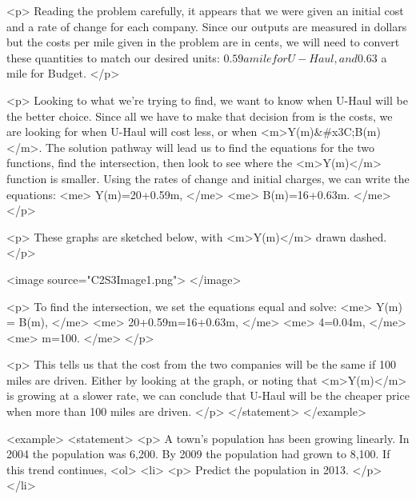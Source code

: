             <p>
                Reading the problem carefully, it appears that we were given an initial cost and a rate of change for each company.
                Since our outputs are measured in dollars but the costs per mile given in the problem are in cents, we will need to convert these quantities to match our desired units: $0.59 a mile for U-Haul, and $0.63 a mile for Budget.
            </p>

            <p>
                Looking to what we’re trying to find, we want to know when U-Haul will be the better choice.
                Since all we have to make that decision from is the costs, we are looking for when U-Haul will cost less, or when <m>Y(m)&#x3C;B(m)</m>.
                The solution pathway will lead us to find the equations for the two functions, find the intersection, then look to see where the <m>Y(m)</m> function is smaller.
                Using the rates of change and initial charges, we can write the equations:
                <me>
                    Y(m)=20+0.59m,
                </me>
                <me>
                    B(m)=16+0.63m.
                </me>
            </p>

            <p>
                These graphs are sketched below, with <m>Y(m)</m> drawn dashed.
            </p>

            <image source="C2S3Image1.png">
            </image>

            <p>
                To find the intersection, we set the equations equal and solve:
                <me>
                    Y(m) = B(m),
                </me>
                <me>
                    20+0.59m=16+0.63m,
                </me>
                <me>
                    4=0.04m,
                </me>
                <me>
                    m=100.
                </me>
            </p>

            <p>
                This tells us that the cost from the two companies will be the same if 100 miles are driven.
                Either by looking at the graph, or noting that <m>Y(m)</m> is growing at a slower rate, we can conclude that U-Haul will be the cheaper price when more than 100 miles are driven.
            </p>
        </statement>
    </example>

    <example>
        <statement>
            <p>
                A town’s population has been growing linearly.
                In 2004 the population was 6,200.
                By 2009 the population had grown to 8,100.
                If this trend continues,
                <ol>
                    <li>
                        <p>
                            Predict the population in 2013.
                        </p>
                    </li>

